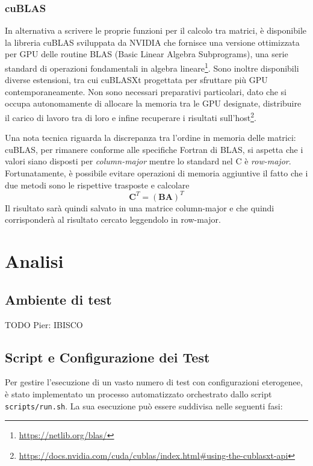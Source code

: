 \documentclass[a4paper]{article}
\begin{document}
\subsubsection{cuBLAS}
In alternativa a scrivere le proprie funzioni per il calcolo tra matrici, è disponibile la libreria cuBLAS sviluppata da NVIDIA che fornisce una versione ottimizzata per GPU delle routine BLAS (Basic Linear Algebra Subprograms), una serie standard di operazioni fondamentali in algebra lineare\footnote{\url{https://netlib.org/blas/}}. Sono inoltre disponibili diverse estensioni, tra cui cuBLASXt progettata per sfruttare più GPU contemporaneamente. Non sono necessari preparativi particolari, dato che si occupa autonomamente di allocare la memoria tra le GPU designate, distribuire il carico di lavoro tra di loro e infine recuperare i risultati sull'host\footnote{\url{https://docs.nvidia.com/cuda/cublas/index.html\#using-the-cublasxt-api}}.

Una nota tecnica riguarda la discrepanza tra l'ordine in memoria delle matrici: cuBLAS, per rimanere conforme alle specifiche Fortran di BLAS, si aspetta che i valori siano disposti per \textit{column-major} mentre lo standard nel C è \textit{row-major}. Fortunatamente, è possibile evitare operazioni di memoria aggiuntive il fatto che i due metodi sono le rispettive trasposte e calcolare
$$
    \mathbf{C}^T=(\mathbf{B}\mathbf{A})^T
$$
Il risultato sarà quindi salvato in una matrice column-major e che quindi corrisponderà al risultato cercato leggendolo in row-major.

\section{Analisi}

\subsection{Ambiente di test}

TODO Pier: IBISCO

\subsection{Script e Configurazione dei Test}

Per gestire l'esecuzione di un vasto numero di test con configurazioni eterogenee, è stato implementato un processo automatizzato orchestrato dallo script \texttt{scripts/run.sh}. La sua esecuzione può essere suddivisa nelle seguenti fasi:
\end{document}
